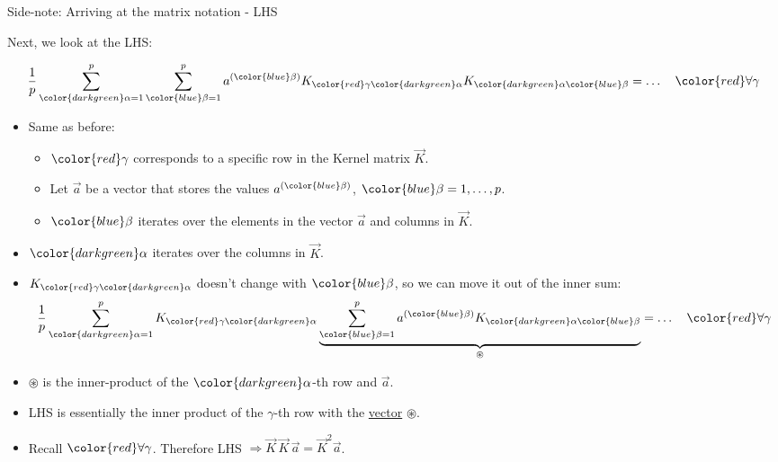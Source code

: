 
\begin{frame}{Side-note: Arriving at the matrix notation - LHS}

Next, we look at the LHS:

\svspace{-3mm}

\begin{equation}
 \frac{1}{p} \sum_{{\color{darkgreen}\alpha=1}}^{p} \sum^{p}_{{\color{blue}\beta=1}} 
a^{({\color{blue}\beta})}
K_{{\color{red}\gamma} {\color{darkgreen}\alpha}}
K_{{\color{darkgreen}\alpha} {\color{blue}\beta}} = \ldots
 \quad {\color{red}\forall \gamma}
\end{equation}

\svspace{-1mm}

\begin{itemize}
\item Same as before:
\begin{itemize}
\item ${\color{red}\gamma}$ corresponds to a specific row in the Kernel matrix $\vec K$.
\item Let $\vec a$ be a vector that stores the values $a^{({\color{blue}\beta})}$, ${\color{blue}\beta=1,\ldots,p}$.
\item ${\color{blue}\beta}$ iterates over the elements in the vector $\vec a$ and columns in $\vec K$.
\end{itemize}
\item ${\color{darkgreen}\alpha}$ iterates over the columns in $\vec K$.
\item $K_{{\color{red}\gamma} {\color{darkgreen}\alpha}}$ doesn't change with ${\color{blue}\beta}$, so we can move it out of the inner sum:
\svspace{-3mm}
\begin{align}
 \frac{1}{p} \sum_{{\color{darkgreen}\alpha=1}}^{p} 
 K_{{\color{red}\gamma} {\color{darkgreen}\alpha}}
 \underbrace{
\sum^{p}_{{\color{blue}\beta=1}} 
a^{({\color{blue}\beta})}
K_{{\color{darkgreen}\alpha} {\color{blue}\beta}}}_{\circledast} = \ldots
 \quad {\color{red}\forall \gamma}
\end{align}
\item $\circledast$ is the inner-product of the ${\color{darkgreen}\alpha}$-th row and $\vec a$.
\item LHS is essentially the inner product of the $\gamma$-th row with the \underline{vector} $\circledast$.
\item Recall ${\color{red}\forall \gamma}$. Therefore LHS $\Rightarrow \vec K \, \vec K \, \vec a = \vec K^2 \vec a$.  

\end{itemize}

\end{frame}

